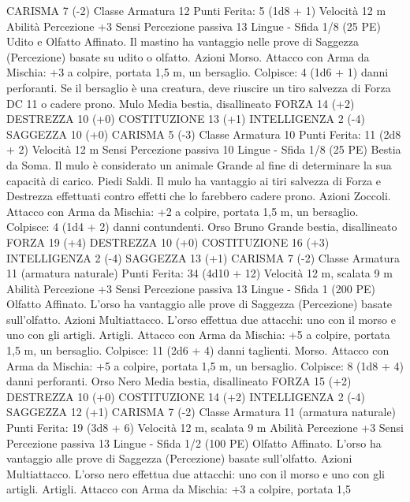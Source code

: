 \begin{multicols}{2}
CARISMA 7 (-2)
Classe Armatura 12
\hspace*{0pt}\hfill{Punti Ferita}: 5 (1d8 + 1)
Velocità 12 m
Abilità Percezione +3
Sensi Percezione passiva 13
Lingue -
Sfida 1/8 (25 PE)
Udito e Olfatto Affinato. Il mastino ha vantaggio nelle prove di
Saggezza (Percezione) basate su udito o olfatto.
Azioni
Morso. Attacco con Arma da Mischia: +3 a colpire, portata 1,5
m, un bersaglio.
Colpisce: 4 (1d6 + 1) danni perforanti. Se il bersaglio è una creatura,
deve riuscire un tiro salvezza di Forza DC 11 o cadere prono.
Mulo
Media bestia, disallineato
FORZA 14 (+2)
DESTREZZA 10 (+0)
COSTITUZIONE 13 (+1)
INTELLIGENZA 2 (-4)
SAGGEZZA 10 (+0)
CARISMA 5 (-3)
Classe Armatura 10
\hspace*{0pt}\hfill{Punti Ferita}: 11 (2d8 + 2)
Velocità 12 m
Sensi Percezione passiva 10
Lingue -
Sfida 1/8 (25 PE)
Bestia da Soma. Il mulo è considerato un animale Grande al fine
di determinare la sua capacità di carico.
Piedi Saldi. Il mulo ha vantaggio ai tiri salvezza di Forza e
Destrezza effettuati contro effetti che lo farebbero cadere prono.
Azioni
Zoccoli. Attacco con Arma da Mischia: +2 a colpire, portata 1,5
m, un bersaglio.
Colpisce: 4 (1d4 + 2) danni contundenti.
Orso Bruno
Grande bestia, disallineato
FORZA 19 (+4)
DESTREZZA 10 (+0)
COSTITUZIONE 16 (+3)
INTELLIGENZA 2 (-4)
SAGGEZZA 13 (+1)
CARISMA 7 (-2)
Classe Armatura 11 (armatura naturale)
\hspace*{0pt}\hfill{Punti Ferita}: 34 (4d10 + 12)
Velocità 12 m, scalata 9 m
Abilità Percezione +3
Sensi Percezione passiva 13
Lingue -
Sfida 1 (200 PE)
Olfatto Affinato. L’orso ha vantaggio alle prove di Saggezza
(Percezione) basate sull’olfatto.
Azioni
Multiattacco. L’orso effettua due attacchi: uno con il morso e
uno con gli artigli.
Artigli. Attacco con Arma da Mischia: +5 a colpire, portata 1,5
m, un bersaglio.
Colpisce: 11 (2d6 + 4) danni taglienti.
Morso. Attacco con Arma da Mischia: +5 a colpire, portata 1,5
m, un bersaglio.
Colpisce: 8 (1d8 + 4) danni perforanti.
Orso Nero
Media bestia, disallineato
FORZA 15 (+2)
DESTREZZA 10 (+0)
COSTITUZIONE 14 (+2)
INTELLIGENZA 2 (-4)
SAGGEZZA 12 (+1)
CARISMA 7 (-2)
Classe Armatura 11 (armatura naturale)
\hspace*{0pt}\hfill{Punti Ferita}: 19 (3d8 + 6)
Velocità 12 m, scalata 9 m
Abilità Percezione +3
Sensi Percezione passiva 13
Lingue -
Sfida 1/2 (100 PE)
Olfatto Affinato. L’orso ha vantaggio alle prove di Saggezza
(Percezione) basate sull’olfatto.
Azioni
Multiattacco. L’orso nero effettua due attacchi: uno con il morso
e uno con gli artigli.
Artigli. Attacco con Arma da Mischia: +3 a colpire, portata 1,5

\end{multicols}
